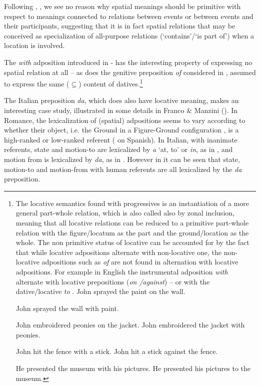 \documentclass[output=paper,modfonts,nonflat,newtxmath,colorlinks,citecolor=brown]{langsci/langscibook}
\begin{document}
Following \citet{ManziniSavoia2011}, \citet{FrancoManziniGen, FrancoManzini2017Ins}, we see no reason why spatial meanings should be primitive with respect to meanings connected to relations between events or between events and their participants, suggesting that it is in fact spatial relations that may be conceived as specialization of all-purpose relations (‘contains’/‘is part of’) when a location is involved. 

The \textit{with} adposition introduced in - has the interesting property of expressing no spatial relation at all \citep{Levinson2011} – as does the genitive preposition \textit{of} considered in , assumed to express the same (${\subseteq}$) content of datives.\footnote{The locative semantics found with progressives is an instantiation of a more general part-whole relation, which is also called also by \citet[170]{BelvindenDikken1997} {zonal inclusion}, meaning that all locative relations can be reduced to a primitive part-whole relation with the {figure/locatum} as the {part} and the {ground/location} as the {whole}. The non primitive status of locative can be accounted for by the fact that while locative adpositions alternate with non-locative one, the non-locative adpositions such as \textit{of} are not found in alternation with locative adpositions. For example in English the instrumental adposition \textit{with} alternate with locative prepositions (\textit{on /against}) -- or with the dative/locative \textit{to} . 
\ea %
    \label{ex:franco:i}
    \ea John sprayed the paint on the wall. 
    
    \ex John sprayed the wall with paint.
    \z
    \z

\ea %
    \label{ex:franco:ii}
    \ea John embroidered peonies on the jacket.
    \ex John embroidered the jacket with peonies.
    \z
    \z
    
\ea %
    \label{ex:franco:iii}
    \ea John hit the fence with a stick.
    \ex John hit a stick against the fence.
    \z
    \z
    
\ea %
    \label{ex:franco:iv}
    \ea He presented the museum with his pictures.
    \ex He presented his pictures to the museum.
    \z
    \z

} 

The Italian preposition \textit{da}, which does also have locative meaning, makes an interesting case study, illustrated in some details in Franco \& Manzini (\citeyear{FrancoManzini2017Gen, FrancoManzini2017Ins}). In Romance, the lexicalization of (spatial) adpositions seems to vary according to whether their object, i.e. the Ground in a Figure-Ground configuration \citep{Svenonius2006axial}, is a high-ranked or low-ranked referent (\citealt{Fabregas2015direccionales} on Spanish). In Italian, with inanimate referents, state and motion-to are lexicalized by \textit{a} ‘at, to’ or \textit{in}, as in , and motion from is lexicalized by \textit{da}, as in . However in  it can be seen that state, motion-to and motion-from with human referents are all lexicalized by the \textit{da} preposition. 
\end{document}
